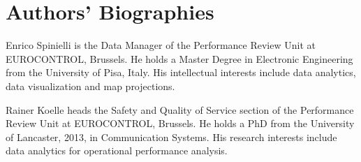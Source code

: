 \setlength{\parskip}{6pt}

\vspace*{1\baselineskip}
\hypertarget{biographies}{%
\section*{Authors' Biographies}\label{biographies}}

\vspace*{-3\baselineskip}

\begin{IEEEbiographynophoto}{\normalsize Enrico Spinielli}\normalsize
is the Data Manager of the Performance Review Unit at EUROCONTROL, Brussels.
He holds a Master Degree in Electronic Engineering from the University of Pisa, Italy.
His intellectual interests include data analytics, data visualization and
map projections.
\end{IEEEbiographynophoto}

\vspace*{-2.5\baselineskip}

\begin{IEEEbiographynophoto}{\normalsize Rainer Koelle}\normalsize
heads the Safety and Quality of Service section
of the Performance Review Unit at EUROCONTROL, Brussels.
He holds a PhD from the University of Lancaster, 2013, in Communication Systems.
His research interests include data analytics for operational performance analysis.
\end{IEEEbiographynophoto}

\vfill
